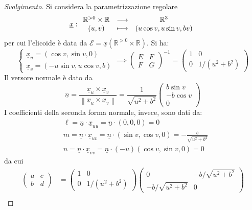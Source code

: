 \documentclass[12pt]{scrartcl}
\theoremstyle{style}
\newenvironment{svolgimento}{\renewcommand\qedsymbol{$\blacksquare$}\begin{proof}[Svolgimento]}{\end{proof}}
\numberwithin{equation}{subsection}
\begin{document}
\begin{svolgimento}
	Si considera la parametrizzazione regolare
	\[
	\underline{x}: 
	\begin{array}
		{c c c}
		\mathbb{R}^{>0} \times \mathbb{R} & \longrightarrow & \mathbb{R}^3\\
		(u,v) &\longmapsto & (u \cos v , u \sin v , bv)
	\end{array}
	\] 
	per cui l'elicoide \`e data da $\mathcal{E} = \underline{x}(\mathbb{R}^{>0} \times \mathbb{R})$.
	Si ha:
	\[
	\begin{cases}
		\underline{x}_u = (\cos v, \sin v,0)\\
		\underline{x}_v = (-u \sin v , u \cos v, b)
		\end{cases} \implies \begin{pmatrix} E & F \\ F & G \end{pmatrix}^{-1}  = \begin{pmatrix} 1 & 0 \\ 0 & 1 / (u^2 + b^2) \end{pmatrix} 
	\] 
Il versore normale \`e dato da 
\[
\underline{n} = \frac{\underline{x}_u \times \underline{x}_v}{\left\lVert \underline{x}_u \times \underline{x}_v \right\rVert }= \frac{1}{\sqrt{u^2 + b^2 } } \begin{pmatrix} b \sin v \\ -b \cos v \\ 0 \end{pmatrix} 
\] 
I coefficienti della seconda forma normale, invece, sono dati da:
\[
\begin{split}
	& \ell  = \underline{n} \cdot  \underline{x}_{u u } = \underline{n} \cdot (0,0,0) = 0 \\
	& m = \underline{n} \cdot \underline{x}_{uv}  = \underline{n} \cdot (\sin v , \cos v,0)  =- \frac{b}{ \sqrt{u^2 + b^2} }\\
	& n = \underline{n} \cdot \underline{x}_{v v }  = \underline{n} \cdot (-u) (\cos v , \sin v,0) = 0 
\end{split}
\] 
da cui
\[
	\begin{split}
		\begin{pmatrix} a & c \\b & d \end{pmatrix} &= \begin{pmatrix} 1 & 0 \\ 0 & 1 / (u^2 + b^2) \end{pmatrix} \begin{pmatrix} 0 &-b /\sqrt{u^2 + b^2}\\ -b /\sqrt{u^2 + b^2} & 0   \end{pmatrix} \\

\end{split}\]
\end{svolgimento}
\end{document}
